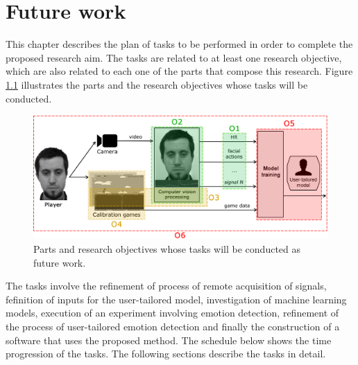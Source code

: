 \chapter{Future work}
\label{ch:closing}

This chapter describes the plan of tasks to be performed in order to complete the proposed research aim. The tasks are related to at least one research objective, which are also related to each one of the parts that compose this research. Figure \ref{fig:future-work-objectives} illustrates the parts and the research objectives whose tasks will be conducted.

\begin{figure}[h]
    \centering
    \includegraphics[width=\textwidth]{figures/components-objectives.png}
    \caption{Parts and research objectives whose tasks will be conducted as future work.}
    \label{fig:future-work-objectives}
\end{figure}

The tasks involve the refinement of process of remote acquisition of signals, fefinition of inputs for the user-tailored model, investigation of machine learning models, execution of an experiment involving emotion detection, refinement of the process of user-tailored emotion detection and finally the construction of a software that uses the proposed method. The schedule below shows the time progression of the tasks. The following sections describe the tasks in detail.

